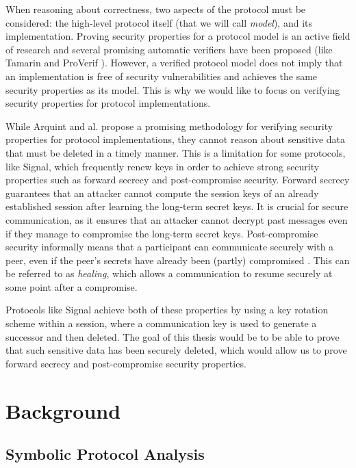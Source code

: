 \documentclass{article}
\begin{document}
When reasoning about correctness, two aspects of the protocol must be considered: the high-level protocol itself (that we will call \textit{model}), and its implementation. Proving security properties for a protocol model is an active field of research and several promising automatic verifiers have been proposed (like Tamarin \cite{meier2013tamarin} and ProVerif \cite{blanchet2016modeling}). However, a verified protocol model does not imply that an implementation is free of security vulnerabilities and achieves the same security properties as its model. This is why we would like to focus on verifying security properties for protocol implementations.

While Arquint and al.\cite{arquint2022generic} propose a promising methodology for verifying security properties for protocol implementations, they cannot reason about sensitive data that must be deleted in a timely manner. This is a limitation for some protocols, like Signal\cite{marlinspike2016x3dh}, which frequently renew keys in order to achieve strong security properties such as forward secrecy and post-compromise security. 
Forward secrecy guarantees that an attacker cannot compute the session keys of an already established session after learning the long-term secret keys. It is crucial for secure communication, as it ensures that an attacker cannot decrypt past messages even if they manage to compromise the long-term secret keys.
Post-compromise security informally means that a participant can communicate securely with a peer, even if the peer’s secrets have already been (partly) compromised \cite{7536374}.
This can be referred to as \textit{healing}, which allows a communication to resume securely at some point after a compromise.

Protocols like Signal achieve both of these properties by using a key rotation scheme within a session, where a communication key is used to generate a successor and then deleted. The goal of this thesis would be to be able to prove that such sensitive data has been securely deleted, which would allow us to prove forward secrecy and post-compromise security properties.

\section{Background}

\subsection{Symbolic Protocol Analysis}
\label{sec:symbolic-analysis}
\end{document}
